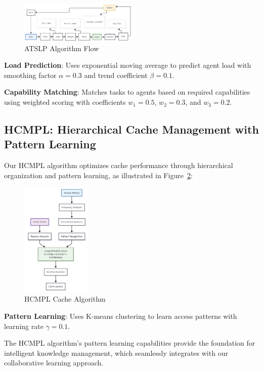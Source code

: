 \documentclass[conference]{IEEEtran}
\begin{document}
\begin{figure}[htbp]
\centering
\includegraphics[width=0.5\textwidth]{images/awrr_algorithm_flow.png}
\caption{ATSLP Algorithm Flow}
\label{fig:atslp}
\end{figure}

\textbf{Load Prediction}: Uses exponential moving average to predict agent load with smoothing factor $\alpha = 0.3$ and trend coefficient $\beta = 0.1$.

\textbf{Capability Matching}: Matches tasks to agents based on required capabilities using weighted scoring with coefficients $w_1 = 0.5$, $w_2 = 0.3$, and $w_3 = 0.2$.

\subsection{HCMPL: Hierarchical Cache Management with Pattern Learning}

Our HCMPL algorithm optimizes cache performance through hierarchical organization and pattern learning, as illustrated in Figure~\ref{fig:hcmpl}:

\begin{figure}[htbp]
\centering
\includegraphics[width=0.3\textwidth]{images/paac_cache_algorithm.png}
\caption{HCMPL Cache Algorithm}
\label{fig:hcmpl}
\end{figure}

\textbf{Pattern Learning}: Uses K-means clustering to learn access patterns with learning rate $\gamma = 0.1$.

The HCMPL algorithm's pattern learning capabilities provide the foundation for intelligent knowledge management, which seamlessly integrates with our collaborative learning approach.
\end{document}
